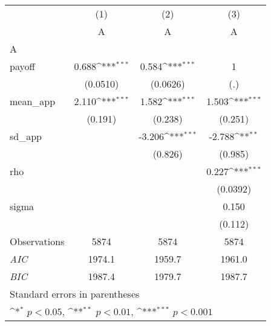 {
\def\sym#1{\ifmmode^{#1}\else\(^{#1}\)\fi}
\begin{tabular}{l*{3}{c}}
\hline\hline
                    &\multicolumn{1}{c}{(1)}&\multicolumn{1}{c}{(2)}&\multicolumn{1}{c}{(3)}\\
                    &\multicolumn{1}{c}{A}&\multicolumn{1}{c}{A}&\multicolumn{1}{c}{A}\\
\hline
A                   &                     &                     &                     \\
payoff              &       0.688\sym{***}&       0.584\sym{***}&           1         \\
                    &    (0.0510)         &    (0.0626)         &         (.)         \\
[1em]
mean\_app            &       2.110\sym{***}&       1.582\sym{***}&       1.503\sym{***}\\
                    &     (0.191)         &     (0.238)         &     (0.251)         \\
[1em]
sd\_app              &                     &      -3.206\sym{***}&      -2.788\sym{**} \\
                    &                     &     (0.826)         &     (0.985)         \\
[1em]
rho                 &                     &                     &       0.227\sym{***}\\
                    &                     &                     &    (0.0392)         \\
[1em]
sigma               &                     &                     &       0.150         \\
                    &                     &                     &     (0.112)         \\
\hline
Observations        &        5874         &        5874         &        5874         \\
\textit{AIC}        &      1974.1         &      1959.7         &      1961.0         \\
\textit{BIC}        &      1987.4         &      1979.7         &      1987.7         \\
\hline\hline
\multicolumn{4}{l}{\footnotesize Standard errors in parentheses}\\
\multicolumn{4}{l}{\footnotesize \sym{*} \(p<0.05\), \sym{**} \(p<0.01\), \sym{***} \(p<0.001\)}\\
\end{tabular}
}

